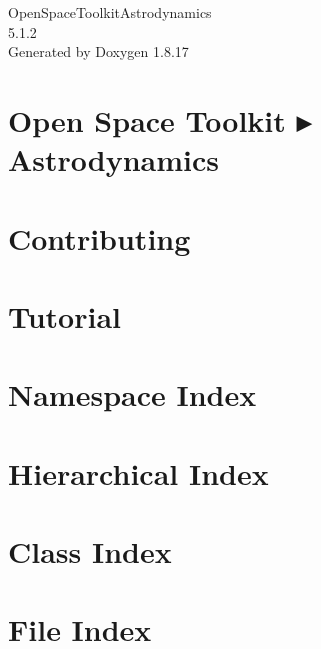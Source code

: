 \let\mypdfximage\pdfximage\def\pdfximage{\immediate\mypdfximage}\documentclass[twoside]{book}
\newcommand{\+}{\discretionary{\mbox{\scriptsize$\hookleftarrow$}}{}{}}
\newcommand{\clearemptydoublepage}{%
  \newpage{\pagestyle{empty}\cleardoublepage}%
}
\begin{document}
\hypersetup{pageanchor=false,
             bookmarksnumbered=true,
             pdfencoding=unicode
            }
\begin{titlepage}
\vspace*{7cm}
\begin{center}%
{\Large Open\+Space\+Toolkit\+Astrodynamics \\[1ex]\large 5.\+1.\+2 }\\
\vspace*{1cm}
{\large Generated by Doxygen 1.8.17}\\
\end{center}
\end{titlepage}
\clearemptydoublepage
{}
\tableofcontents
\clearemptydoublepage
{}
\hypersetup{pageanchor=true}

\chapter{Open Space Toolkit ▸ Astrodynamics}
\label{index}\hypertarget{index}{}
\chapter{Contributing}
\label{md__c_o_n_t_r_i_b_u_t_i_n_g}

\chapter{Tutorial}
\label{md_docs__tutorial}

\chapter{Namespace Index}

\chapter{Hierarchical Index}

\chapter{Class Index}

\chapter{File Index}

\end{document}
